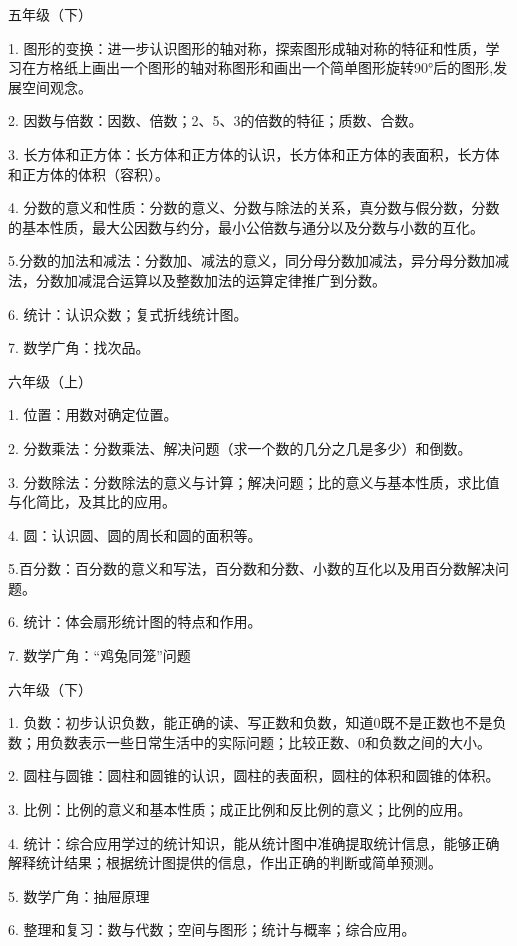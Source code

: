 五年级（下）

1. 图形的变换：进一步认识图形的轴对称，探索图形成轴对称的特征和性质，学习在方格纸上画出一个图形的轴对称图形和画出一个简单图形旋转90°后的图形,发展空间观念。

2. 因数与倍数：因数、倍数；2、5、3的倍数的特征；质数、合数。

3. 长方体和正方体：长方体和正方体的认识，长方体和正方体的表面积，长方体和正方体的体积（容积）。

4. 分数的意义和性质：分数的意义、分数与除法的关系，真分数与假分数，分数的基本性质，最大公因数与约分，最小公倍数与通分以及分数与小数的互化。

5.分数的加法和减法：分数加、减法的意义，同分母分数加减法，异分母分数加减法，分数加减混合运算以及整数加法的运算定律推广到分数。

6. 统计：认识众数；复式折线统计图。

7. 数学广角：找次品。

六年级（上）

1. 位置：用数对确定位置。

2. 分数乘法：分数乘法、解决问题（求一个数的几分之几是多少）和倒数。

3. 分数除法：分数除法的意义与计算；解决问题；比的意义与基本性质，求比值与化简比，及其比的应用。

4. 圆：认识圆、圆的周长和圆的面积等。

5.百分数：百分数的意义和写法，百分数和分数、小数的互化以及用百分数解决问题。

6. 统计：体会扇形统计图的特点和作用。

7. 数学广角：“鸡兔同笼”问题

六年级（下）

1. 负数：初步认识负数，能正确的读、写正数和负数，知道0既不是正数也不是负数；用负数表示一些日常生活中的实际问题；比较正数、0和负数之间的大小。

2. 圆柱与圆锥：圆柱和圆锥的认识，圆柱的表面积，圆柱的体积和圆锥的体积。

3. 比例：比例的意义和基本性质；成正比例和反比例的意义；比例的应用。

4. 统计：综合应用学过的统计知识，能从统计图中准确提取统计信息，能够正确解释统计结果；根据统计图提供的信息，作出正确的判断或简单预测。

5. 数学广角：抽屉原理

6. 整理和复习：数与代数；空间与图形；统计与概率；综合应用。